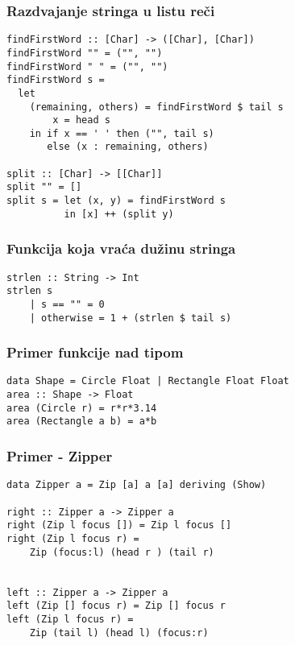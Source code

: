 \documentclass{beamer}
\begin{document}
\begin{frame}[fragile]
\frametitle{Razdvajanje stringa u listu reči}
\begin{lstlisting}
findFirstWord :: [Char] -> ([Char], [Char])
findFirstWord "" = ("", "")
findFirstWord " " = ("", "")
findFirstWord s =
  let 
    (remaining, others) = findFirstWord $ tail s
        x = head s
    in if x == ' ' then ("", tail s) 
       else (x : remaining, others)

split :: [Char] -> [[Char]]
split "" = []
split s = let (x, y) = findFirstWord s
          in [x] ++ (split y)
\end{lstlisting}
\end{frame}

\begin{frame}[fragile]
\frametitle{Funkcija koja vraća dužinu stringa}
\begin{lstlisting}
strlen :: String -> Int
strlen s
    | s == "" = 0
    | otherwise = 1 + (strlen $ tail s)
\end{lstlisting}
\end{frame}



\begin{frame}[fragile]
\frametitle{Primer funkcije nad tipom}
\begin{lstlisting}
data Shape = Circle Float | Rectangle Float Float 
area :: Shape -> Float 
area (Circle r) = r*r*3.14
area (Rectangle a b) = a*b
\end{lstlisting}
\end{frame}


\begin{frame}[fragile]
\frametitle{Primer - Zipper}
\begin{lstlisting}
data Zipper a = Zip [a] a [a] deriving (Show)

right :: Zipper a -> Zipper a
right (Zip l focus []) = Zip l focus [] 
right (Zip l focus r) = 
    Zip (focus:l) (head r ) (tail r)


left :: Zipper a -> Zipper a
left (Zip [] focus r) = Zip [] focus r
left (Zip l focus r) = 
    Zip (tail l) (head l) (focus:r)

\end{lstlisting}
\end{frame}
\end{document}
